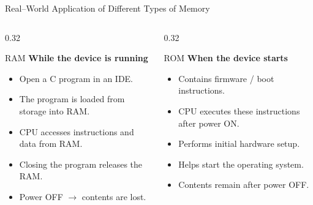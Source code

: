 \documentclass[aspectratio=169]{beamer}
\begin{document}
	\begin{frame}{Real--World Application of Different Types of Memory}
		
		\begin{columns}[T]
			
			\begin{column}{0.32\textwidth}
				
				\begin{block}{RAM}
					\centering
					\textbf{While the device is running}
					
					\vspace{0.2cm}
					
					\begin{itemize}\small
						\item Open a C program in an IDE.
						\item The program is loaded from storage into RAM.
						\item CPU accesses instructions and data from RAM.
						\item Closing the program releases the RAM.
						\item Power OFF $\rightarrow$ contents are lost.
					\end{itemize}
					
				\end{block}
				
			\end{column}
			
			\begin{column}{0.32\textwidth}
				
				\begin{block}{ROM}
					\centering
					\textbf{When the device starts}
					
					\vspace{0.2cm}
					
					\begin{itemize}\small
						\item Contains firmware / boot instructions.
						\item CPU executes these instructions after power ON.
						\item Performs initial hardware setup.
						\item Helps start the operating system.
						\item Contents remain after power OFF.
					\end{itemize}
					

\end{block}
\end{column}
\end{columns}
\end{frame}
\end{document}
